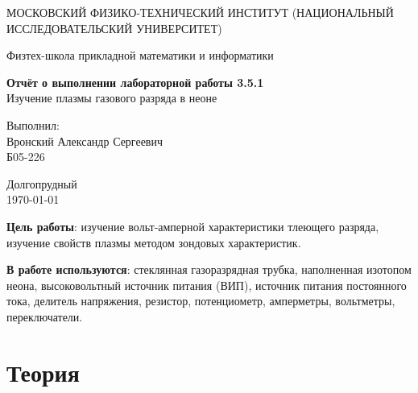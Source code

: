 \documentclass[a4paper,12pt]{article}
\date{\today}
\begin{document}
\begin{titlepage}
	\begin{center}
		{\large МОСКОВСКИЙ ФИЗИКО-ТЕХНИЧЕСКИЙ ИНСТИТУТ (НАЦИОНАЛЬНЫЙ ИССЛЕДОВАТЕЛЬСКИЙ УНИВЕРСИТЕТ)}
	\end{center}
	\begin{center}
		{\large Физтех-школа прикладной математики и информатики}
	\end{center}


	\vspace{4.5cm}
	{\huge
		\begin{center}
			{\bf Отчёт о выполнении лабораторной работы 3.5.1}\\
      Изучение плазмы газового разряда в неоне
		\end{center}
	}
	\vspace{2cm}
	\begin{flushright}
		{\LARGE Выполнил:\\ Вронский Александр Сергеевич \\
			\vspace{0.2cm}
			Б05-226}
	\end{flushright}
	\vspace{8cm}
	\begin{center}
		Долгопрудный\\
		\today
	\end{center}
\end{titlepage}

\textbf{Цель работы}: изучение вольт-амперной характеристики тлеющего разряда, изучение свойств плазмы методом зондовых характеристик.


\textbf{В работе используются}: стеклянная газоразрядная трубка, наполненная изотопом неона, высоковольтный источник питания (ВИП), источник питания постоянного тока, делитель напряжения, резистор, потенциометр, амперметры, вольтметры, переключатели.
\section*{Теория}
\end{document}
